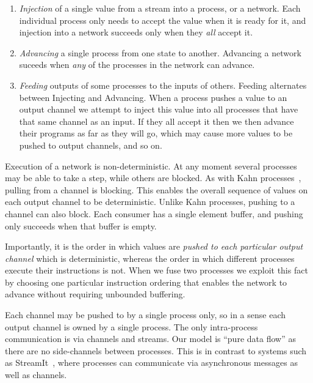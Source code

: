 \begin{enumerate}
\item \emph{Injection} of a single value from a stream into a process, or a network. Each individual process only needs to accept the value when it is ready for it, and injection into a network succeeds only when they \emph{all} accept it.

\item \emph{Advancing} a single process from one state to another. Advancing a network suceeds when \emph{any} of the processes in the network can advance.

\item \emph{Feeding} outputs of some processes to the inputs of others. Feeding alternates between Injecting and Advancing. When a process pushes a value to an output channel we attempt to inject this value into all processes that have that same channel as an input. If they all accept it then we then advance their programs as far as they will go, which may cause more values to be pushed to output channels, and so on.
\end{enumerate}

Execution of a network is non-deterministic. At any moment several processes may be able to take a step, while others are blocked. As with Kahn processes~\cite{kahn1976coroutines}, pulling from a channel is blocking. This enables the overall sequence of values on each output channel to be deterministic. Unlike Kahn processes, pushing to a channel can also block. Each consumer has a single element buffer, and pushing only succeeds when that buffer is empty.


Importantly, it is the order in which values are \emph{pushed to each particular output channel} which is deterministic, whereas the order in which different processes execute their instructions is not. When we fuse two processes we exploit this fact by choosing one particular instruction ordering that enables the network to advance without requiring unbounded buffering.

Each channel may be pushed to by a single process only, so in a sense each output channel is owned by a single process. The only intra-process communication is via channels and streams. Our model is ``pure data flow'' as there are no side-channels between processes. This is in contrast to systems such as StreamIt~\cite{thies2002streamit}, where processes can communicate via asynchronous messages as well as channels.


